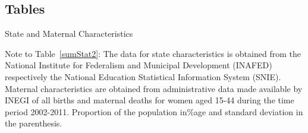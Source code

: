 \documentclass[a4paper, 11pt]{article}
\begin{document}
\begin{spacing}{2}




\section*{Tables}
\begin{table}[H]\caption{State and Maternal Characteristics}\label{sumStat2}
\begin{threeparttable}

\begin{tablenotes}
\item Note to Table~\ref{sumStat2}:	The data for state characteristics is obtained from the National Institute for Federalism and Municipal Development (INAFED) respectively the National Education Statistical Information System (SNIE). Maternal characteristics are obtained from administrative data made available by INEGI of all births and maternal deaths for women aged 15-44 during the time period 2002-2011. Proportion of the population in\%age and standard deviation in the parenthesis.
\end{tablenotes}
\end{threeparttable}
\end{table}




\end{spacing}
\end{document}
